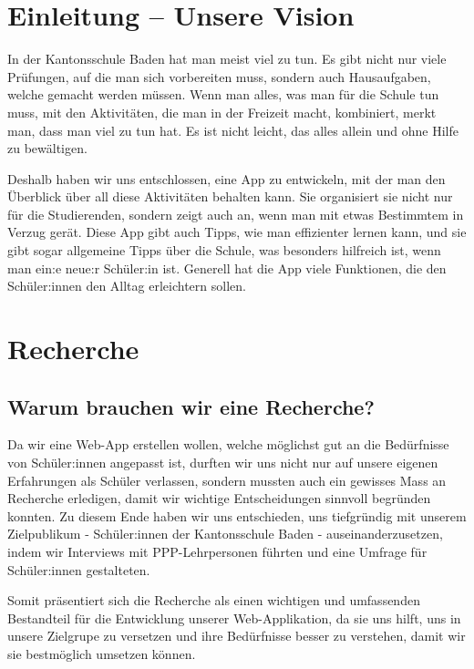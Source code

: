 \documentclass[12pt,a4paper]{report}
\begin{document}
\tableofcontents

\chapter{Einleitung – Unsere Vision}
In der Kantonsschule Baden hat man meist viel zu tun. Es gibt nicht nur viele Prüfungen, auf die man sich vorbereiten muss, sondern auch Hausaufgaben, welche gemacht werden müssen. Wenn man alles, was man für die Schule tun muss, mit den Aktivitäten, die man in der Freizeit macht, kombiniert, merkt man, dass man viel zu tun hat. Es ist nicht leicht, das alles allein und ohne Hilfe zu bewältigen.

Deshalb haben wir uns entschlossen, eine App zu entwickeln, mit der man den Überblick über all diese Aktivitäten behalten kann. Sie organisiert sie nicht nur für die Studierenden, sondern zeigt auch an, wenn man mit etwas Bestimmtem in Verzug gerät. Diese App gibt auch Tipps, wie man effizienter lernen kann, und sie gibt sogar allgemeine Tipps über die Schule, was besonders hilfreich ist, wenn man ein:e neue:r Schüler:in ist. Generell hat die App viele Funktionen, die den Schüler:innen den Alltag erleichtern sollen.

\chapter{Recherche}
\section{Warum brauchen wir eine Recherche?}
Da wir eine Web-App erstellen wollen, welche möglichst gut an die Bedürfnisse von Schüler:innen angepasst ist, durften wir uns nicht nur auf unsere eigenen Erfahrungen als Schüler verlassen, sondern mussten auch ein gewisses Mass an Recherche erledigen, damit wir wichtige Entscheidungen sinnvoll begründen konnten. Zu diesem Ende haben wir uns entschieden, uns tiefgründig mit unserem Zielpublikum - Schüler:innen der Kantonsschule Baden - auseinanderzusetzen, indem wir Interviews mit PPP-Lehrpersonen führten und eine Umfrage für Schüler:innen gestalteten.

Somit präsentiert sich die Recherche als einen wichtigen und umfassenden Bestandteil für die Entwicklung unserer Web-Applikation, da sie uns hilft, uns in unsere Zielgrupe zu versetzen und ihre Bedürfnisse besser zu verstehen, damit wir sie bestmöglich umsetzen können.
\end{document}
